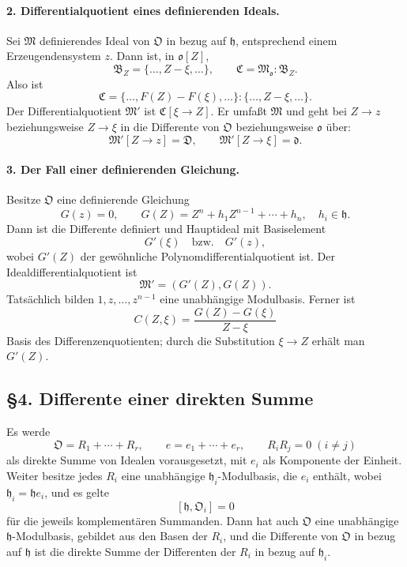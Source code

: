 \documentclass[11pt]{article}
\begin{document}
\paragraph{2. Differentialquotient eines definierenden Ideals.}
Sei $\mathfrak M$ definierendes Ideal von $\mathfrak O$ in bezug auf $\mathfrak h$, entsprechend einem Erzeugendensystem $z$. Dann ist, in $\mathfrak o[Z]$,
\[
        \mathfrak B_Z=\{\ldots,Z-\xi,\ldots\},
        \qquad
        \mathfrak C=\mathfrak M_{\mathfrak o}:\mathfrak B_Z.
\]
Also ist
\[
        \mathfrak C=\{\ldots,F(Z)-F(\xi),\ldots\}:
        \{\ldots,Z-\xi,\ldots\}.
\]
Der Differentialquotient $\mathfrak M'$ ist $\mathfrak C[\xi\to Z]$. Er umfaßt $\mathfrak M$ und geht bei $Z\to z$ beziehungsweise $Z\to\xi$ in die Differente von $\mathfrak O$ beziehungsweise $\mathfrak o$ über:
\[
        \mathfrak M'[Z\to z]=\mathfrak D,
        \qquad
        \mathfrak M'[Z\to \xi]=\mathfrak d.
\]

\paragraph{3. Der Fall einer definierenden Gleichung.}
Besitze $\mathfrak O$ eine definierende Gleichung
\[
        G(z)=0,\qquad
        G(Z)=Z^n+h_1Z^{n-1}+\cdots+h_n,
        \quad h_i\in\mathfrak h.
\]
Dann ist die Differente definiert und Hauptideal mit Basiselement
\[
        G'(\xi) \quad\text{bzw.}\quad G'(z),
\]
wobei $G'(Z)$ der gewöhnliche Polynomdifferentialquotient ist. Der Idealdifferentialquotient ist
\[
        \mathfrak M'=(G'(Z),G(Z)).
\]
Tatsächlich bilden $1,z,\ldots,z^{n-1}$ eine unabhängige Modulbasis. Ferner ist
\[
        C(Z,\xi)=\frac{G(Z)-G(\xi)}{Z-\xi}
\]
Basis des Differenzenquotienten; durch die Substitution $\xi\to Z$ erhält man $G'(Z)$.

\subsection*{§4. Differente einer direkten Summe}

Es werde
\[
        \mathfrak O=R_1+\cdots+R_r,
        \qquad
        e=e_1+\cdots+e_r,
        \qquad R_iR_j=0\;(i\ne j)
\]
als direkte Summe von Idealen vorausgesetzt, mit $e_i$ als Komponente der Einheit. Weiter besitze jedes $R_i$ eine unabhängige $\mathfrak h_i$-Modulbasis, die $e_i$ enthält, wobei $\mathfrak h_i=\mathfrak h e_i$, und es gelte
\[
        [\mathfrak h,\mathfrak O_i]=0
\]
für die jeweils komplementären Summanden. Dann hat auch $\mathfrak O$ eine unabhängige $\mathfrak h$-Modulbasis, gebildet aus den Basen der $R_i$, und die Differente von $\mathfrak O$ in bezug auf $\mathfrak h$ ist die direkte Summe der Differenten der $R_i$ in bezug auf $\mathfrak h_i$.
\end{document}
